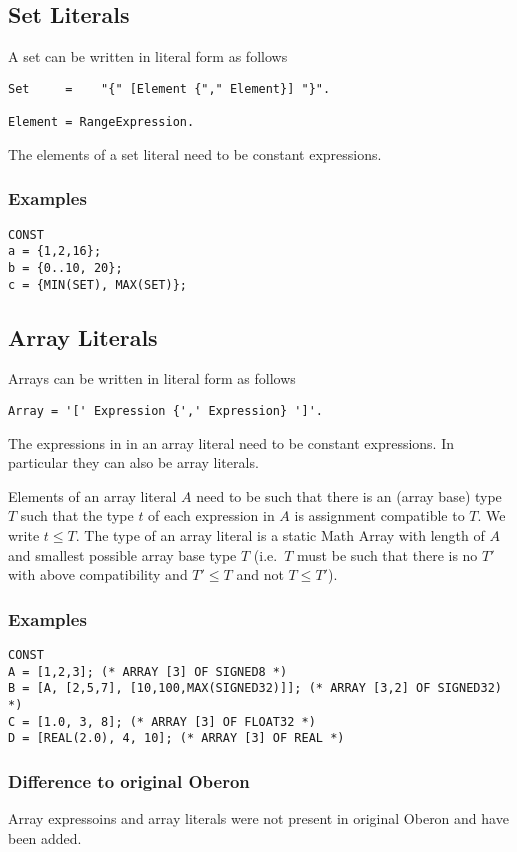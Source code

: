 \documentclass[a4wide,11pt]{article}
\begin{document}
\subsection{Set Literals}

A set can be written in literal form as follows
\begin{lstlisting}[style=ebnf]
Set	    =	 "{" [Element {"," Element}] "}".

Element = RangeExpression.
\end{lstlisting}
The elements of a set literal need to be constant expressions.


\begin{annotation}
\subsubsection{Examples}
\begin{lstlisting}[style=example, caption=Examples of set literals in constant declarations]
CONST
a = {1,2,16};
b = {0..10, 20};
c = {MIN(SET), MAX(SET)};
\end{lstlisting}
\end{annotation}

\subsection{Array Literals}

Arrays can be written in literal form as follows
\begin{lstlisting}[style=ebnf]
Array = '[' Expression {',' Expression} ']'.
\end{lstlisting}
The expressions in in an array literal need to be constant expressions.
In particular they can also be array literals.

Elements of an array literal $A$ need to be such that there is an (array base) type $T$ such that the type $t$ of each expression in $A$ is assignment compatible to $T$.
We write $t\leq T$.
The type of an array literal is a static Math Array with length of $A$ and smallest possible array base type $T$ (i.e.\ $T$ must be such that there is no $T'$ with above compatibility and $T'\leq T$ and not $T \leq T'$).

\begin{annotation}
\subsubsection{Examples}
\begin{lstlisting}[style=example, caption=Examples of array literals in constant declarations]
CONST
A = [1,2,3]; (* ARRAY [3] OF SIGNED8 *)
B = [A, [2,5,7], [10,100,MAX(SIGNED32)]]; (* ARRAY [3,2] OF SIGNED32) *)
C = [1.0, 3, 8]; (* ARRAY [3] OF FLOAT32 *)
D = [REAL(2.0), 4, 10]; (* ARRAY [3] OF REAL *)
\end{lstlisting}

\subsubsection{Difference to original Oberon}
Array expressoins and array literals were not present in original Oberon and have been added.
\end{annotation}
\end{document}
